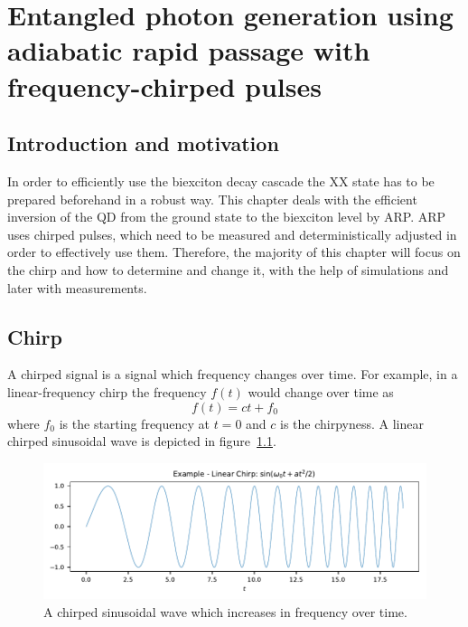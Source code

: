 \chapter{Entangled photon generation using adiabatic rapid passage with frequency-chirped pulses}
\label{cha:chirp}

\section{Introduction and motivation}

In order to efficiently use the biexciton decay cascade the \acl{XX} state has to be prepared beforehand in a robust way.
This chapter deals with the efficient inversion of the \ac{QD} from the ground state to the biexciton level by \ac{ARP}.
\acs{ARP} uses chirped pulses, which need to be measured and deterministically adjusted in order to effectively use them.
Therefore, the majority of this chapter will focus on the chirp and how to determine and change it, with the help of simulations and later with measurements.
 

\section{Chirp}
\label{sec:chirp}
A chirped signal is a signal which frequency changes over time.
For example, in a linear-frequency chirp the frequency $f(t)$ would change over time as
\begin{equation}
f(t) = ct+f_0
\end{equation}
where $f_0$ is the starting frequency at $t=0$ and $c$ is the chirpyness. A linear chirped sinusoidal wave is depicted in figure~\ref{fig:chirped-sin}.

\begin{figure}[H]
	\centering
	\includegraphics[width=\linewidth]{figures/chirp/plots/chirped-sin}
	\caption{A chirped sinusoidal wave which increases in frequency over time.}
	\label{fig:chirped-sin}
\end{figure}

